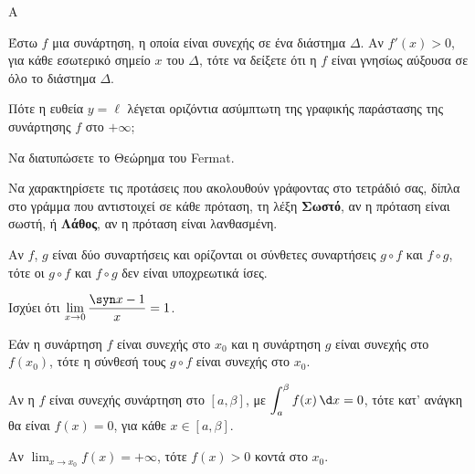 \begin{thema}{Α}
\begin{erwthma}
    \item Έστω $f$ μια συνάρτηση, η οποία είναι συνεχής σε ένα διάστημα $\Delta$. Αν $f'(x) > 0$, για κάθε εσωτερικό σημείο $x$ του $\Delta$, τότε να δείξετε ότι η $f$ είναι γνησίως αύξουσα σε όλο το διάστημα $\Delta$. 

    \item Πότε η ευθεία $y = \ell$ λέγεται οριζόντια ασύμπτωτη της γραφικής παράστασης της συνάρτησης $f$ στο $+\infty$; 

    \item Να διατυπώσετε το Θεώρημα του Fermat. 

    \item Να χαρακτηρίσετε τις προτάσεις που ακολουθούν γράφοντας στο τετράδιό σας, δίπλα στο γράμμα που αντιστοιχεί σε κάθε πρόταση, τη λέξη \textbf{Σωστό}, αν η πρόταση είναι σωστή, ή \textbf{Λάθος}, αν η πρόταση είναι λανθασμένη.
    \begin{alist}
        \item Αν $f$, $g$ είναι δύο συναρτήσεις και ορίζονται οι σύνθετες συναρτήσεις $g \circ f$ και $f \circ g$, τότε οι $g \circ f$ και $f \circ g$ δεν είναι υποχρεωτικά ίσες.

        \item Ισχύει ότι $\displaystyle\lim_{x \to 0} \dfrac{\syn x - 1}{x} = 1$.

        \item Εάν η συνάρτηση $f$ είναι συνεχής στο $x_0$ και η συνάρτηση $g$ είναι συνεχής στο $f(x_0)$, τότε η σύνθεσή τους $g \circ f$ είναι συνεχής στο $x_0$.

        \item Αν η $f$ είναι συνεχής συνάρτηση στο $[a, \beta]$, με $\displaystyle\int_a^\beta f(x)\,\d x = 0$, τότε κατ' ανάγκη θα είναι $f(x) = 0$, για κάθε $x \in [a, \beta]$.

        \item Αν $\displaystyle\lim_{x \to x_0} f(x) = +\infty$, τότε $f(x) > 0$ κοντά στο $x_0$.
    \end{alist}
\end{erwthma}
\end{thema}

